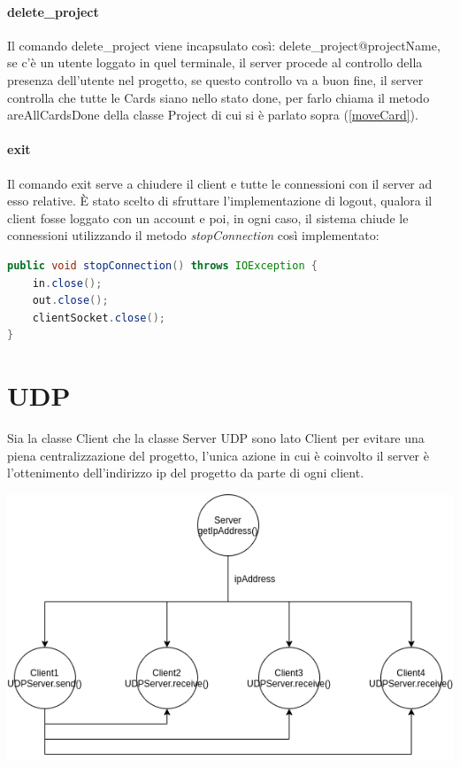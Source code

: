 \documentclass[]{article}
\begin{document}
\paragraph{delete\_project}
Il comando delete\_project viene incapsulato così:
delete\_project@projectName, se c'è un utente loggato in quel terminale, il server procede al controllo della presenza dell'utente nel progetto, se questo controllo va a buon fine, il server controlla che tutte le Cards siano nello stato done, per farlo chiama il metodo areAllCardsDone della classe Project di cui si è parlato sopra (\autoref{moveCard}).
\paragraph{exit}
Il comando exit serve a chiudere il client e tutte le connessioni con il server ad esso relative. È stato scelto di sfruttare l'implementazione di logout, qualora il client fosse loggato con un account e poi, in ogni caso, il sistema chiude le connessioni utilizzando il metodo \textit{stopConnection} così implementato:
\begin{lstlisting}[language=java]
public void stopConnection() throws IOException {
	in.close();
	out.close();
	clientSocket.close();
}
\end{lstlisting}
\newpage
\section{UDP}
Sia la classe Client che la classe Server UDP sono lato Client per evitare una piena centralizzazione del progetto, l'unica azione in cui è coinvolto il server è l'ottenimento dell'indirizzo ip del progetto da parte di ogni client.
\begin{center}
	\includegraphics[scale=.6]{graphChat}
\end{center}
\end{document}
